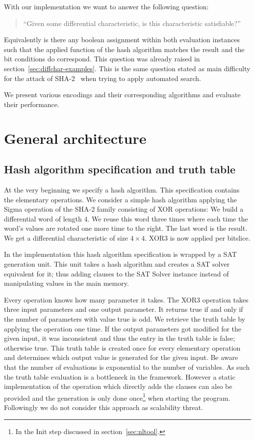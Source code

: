 With our implementation we want to answer the following question:
\begin{quote}
  ``Given some differential characteristic, is this characteristic satisfiable?''
\end{quote}
Equivalently is there any boolean assignment within both evaluation instances such that the applied function of the hash algorithm matches the result and the bit conditions do correspond. This question was already raised in section~\ref{sec:diffchar-examples}. This is the same question stated as main difficulty for the attack of SHA-2~\cite[293]{Cry07} when trying to apply automated search.

We present various encodings and their corresponding algorithms and evaluate their performance.

\section{General architecture}
\label{sec:architecture}
%
%
\subsection{Hash algorithm specification and truth table}
%
At the very beginning we specify a hash algorithm. This specification contains the elementary operations. We consider a simple hash algorithm applying the Sigma operation of the SHA-2 family consisting of XOR operations: We build a differential word of length $4$. We reuse this word three times where each time the word's values are rotated one more time to the right. The last word is the result. We get a differential characteristic of size $4\times 4$. XOR3 is now applied per bitslice.

In the implementation this hash algorithm specification is wrapped by a SAT generation unit. This unit takes a hash algorithm and creates a SAT solver equivalent for it; thus adding clauses to the SAT Solver instance instead of manipulating values in the main memory.

Every operation knows how many parameter it takes. The XOR3 operation takes three input parameters and one output parameter. It returns true if and only if the number of parameters with value true is odd. We retrieve the truth table by applying the operation one time. If the output parameters got modified for the given input, it was inconsistent and thus the entry in the truth table is false; otherwise true. This truth table is created once for every elementary operation and determines which output value is generated for the given input. Be aware that the number of evaluations is exponential to the number of variables. As such the truth table evaluation is a bottleneck in the framework. However a static implementation of the operation which directly adds the clauses can also be provided and the generation is only done once\footnote{In the Init step discussed in section~\ref{sec:nltool}.} when starting the program. Followingly we do not consider this approach as scalability threat.

